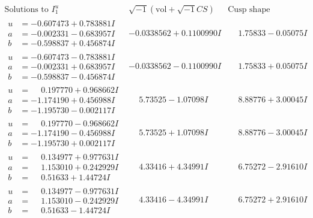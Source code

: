 \documentclass[1p]{elsarticle_modified}
\theoremstyle{definition}
\newcommand{\I}{\sqrt{-1}}
\begin{document}
$$\begin{array}{c|c|c}  
\text{Solutions to }I^u_{1}& \I (\text{vol} + \sqrt{-1}CS) & \text{Cusp shape}\\
 \hline 
\begin{aligned}
u &= -0.607473 + 0.783881 I \\
a &= -0.002331 - 0.683957 I \\
b &= -0.598837 + 0.456874 I\end{aligned}
 & -0.0338562 + 0.1100990 I & \phantom{-}1.75833 - 0.05075 I \\ \hline\begin{aligned}
u &= -0.607473 - 0.783881 I \\
a &= -0.002331 + 0.683957 I \\
b &= -0.598837 - 0.456874 I\end{aligned}
 & -0.0338562 - 0.1100990 I & \phantom{-}1.75833 + 0.05075 I \\ \hline\begin{aligned}
u &= \phantom{-}0.197770 + 0.968662 I \\
a &= -1.174190 + 0.456988 I \\
b &= -1.195730 - 0.002117 I\end{aligned}
 & \phantom{-}5.73525 - 1.07098 I & \phantom{-}8.88776 + 3.00045 I \\ \hline\begin{aligned}
u &= \phantom{-}0.197770 - 0.968662 I \\
a &= -1.174190 - 0.456988 I \\
b &= -1.195730 + 0.002117 I\end{aligned}
 & \phantom{-}5.73525 + 1.07098 I & \phantom{-}8.88776 - 3.00045 I \\ \hline\begin{aligned}
u &= \phantom{-}0.134977 + 0.977631 I \\
a &= \phantom{-}1.153010 + 0.242929 I \\
b &= \phantom{-}0.51633 + 1.44724 I\end{aligned}
 & \phantom{-}4.33416 + 4.34991 I & \phantom{-}6.75272 - 2.91610 I \\ \hline\begin{aligned}
u &= \phantom{-}0.134977 - 0.977631 I \\
a &= \phantom{-}1.153010 - 0.242929 I \\
b &= \phantom{-}0.51633 - 1.44724 I\end{aligned}
 & \phantom{-}4.33416 - 4.34991 I & \phantom{-}6.75272 + 2.91610 I \\ \hline\begin{aligned}

\end{aligned}
\end{array}$$
\end{document}

